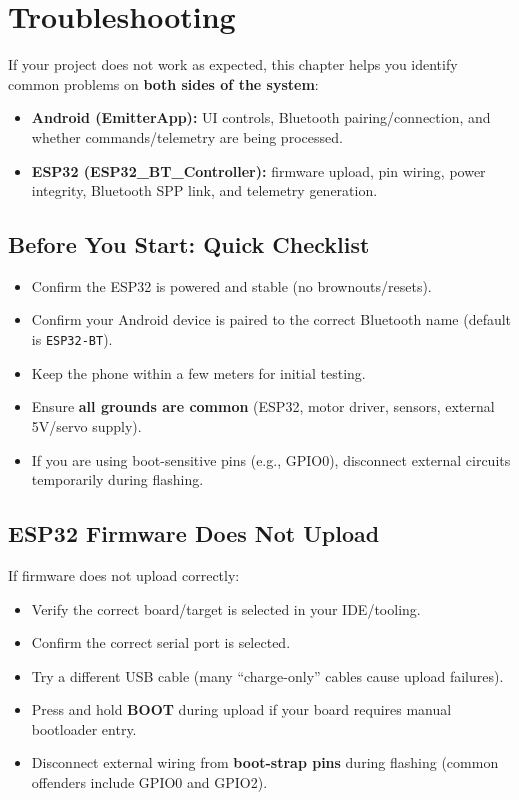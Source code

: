 \chapter{Troubleshooting}
\label{ch:troubleshooting}

If your project does not work as expected, this chapter helps you identify common problems on
\textbf{both sides of the system}:

\begin{itemize}
    \item \textbf{Android (EmitterApp):} UI controls, Bluetooth pairing/connection, and whether commands/telemetry are being processed.
    \item \textbf{ESP32 (ESP32\_BT\_Controller):} firmware upload, pin wiring, power integrity, Bluetooth SPP link, and telemetry generation.
\end{itemize}

\section{Before You Start: Quick Checklist}
\label{sec:quick-checklist}

\begin{itemize}
    \item Confirm the ESP32 is powered and stable (no brownouts/resets).
    \item Confirm your Android device is paired to the correct Bluetooth name (default is \texttt{ESP32-BT}).
    \item Keep the phone within a few meters for initial testing.
    \item Ensure \textbf{all grounds are common} (ESP32, motor driver, sensors, external 5V/servo supply).
    \item If you are using boot-sensitive pins (e.g., GPIO0), disconnect external circuits temporarily during flashing.
\end{itemize}

\section{ESP32 Firmware Does Not Upload}
\label{sec:esp32-upload}

If firmware does not upload correctly:

\begin{itemize}
    \item Verify the correct board/target is selected in your IDE/tooling.
    \item Confirm the correct serial port is selected.
    \item Try a different USB cable (many ``charge-only'' cables cause upload failures).
    \item Press and hold \textbf{BOOT} during upload if your board requires manual bootloader entry.
    \item Disconnect external wiring from \textbf{boot-strap pins} during flashing (common offenders include GPIO0 and GPIO2).
\end{itemize}

